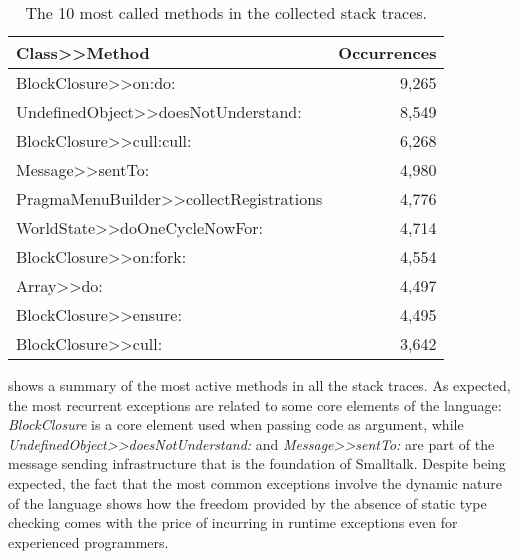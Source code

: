 \begin{table}[t]\small
\centering
\caption{The 10 most called methods in the collected stack traces.}
\begin{tabular}{lr}
\textbf{Class{>}{>}Method} & \textbf{Occurrences} \\ \hline
BlockClosure{>}{>}on:do: & 9,265 \\
UndefinedObject{>}{>}doesNotUnderstand: & 8,549 \\
BlockClosure{>}{>}cull:cull: & 6,268 \\
Message{>}{>}sentTo: & 4,980 \\
PragmaMenuBuilder{>}{>}collectRegistrations & 4,776 \\
WorldState>>doOneCycleNowFor: & 4,714 \\
BlockClosure>>on:fork: & 4,554 \\
Array>>do: & 4,497 \\
BlockClosure>>ensure: & 4,495 \\
BlockClosure>>cull: & 3,642 \\
\hline
\end{tabular}
\label{tab:methods-count}
\end{table}
 shows a summary of the most active methods in all the stack traces.
As expected, the most recurrent exceptions are related to some core elements of the language: \textit{BlockClosure} is a core element used when passing code as argument, while \textit{UndefinedObject>>doesNotUnderstand:} and \textit{Message>>sentTo:} are part of the message sending infrastructure that is the foundation of Smalltalk.
Despite being expected, the fact that the most common exceptions involve the dynamic nature of the language shows how the freedom provided by the absence of static type checking comes with the price of incurring in runtime exceptions even for experienced programmers.

